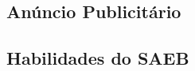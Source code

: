 \begin{conteudo}
\begin{conteudo}
\begin{conteudo}
\begin{conteudo}

\chapter{Anúncio Publicitário}


\section*{Habilidades do SAEB}


\end{conteudo}
\end{conteudo}
\end{conteudo}
\end{conteudo}
